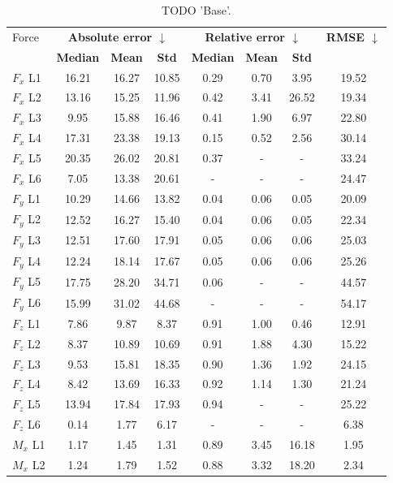 \begin{table}[h]
\centering
\caption{TODO 'Base'.}
\label{tab:prelim:base.tex}
\begin{tabular}{lccccccc}
\toprule
Force & \multicolumn{3}{c}{\bfseries Absolute error $\downarrow$} & \multicolumn{3}{c}{\bfseries Relative error $\downarrow$} & \bfseries RMSE $\downarrow$ \\
  & \bfseries Median & \bfseries Mean & \bfseries Std & \bfseries Median & \bfseries Mean & \bfseries Std & \bfseries   \\
\midrule
$F_x$ L1 & 16.21 & 16.27 & 10.85 & 0.29 & 0.70 & 3.95 & 19.52 \\
$F_x$ L2 & 13.16 & 15.25 & 11.96 & 0.42 & 3.41 & 26.52 & 19.34 \\
$F_x$ L3 & 9.95 & 15.88 & 16.46 & 0.41 & 1.90 & 6.97 & 22.80 \\
$F_x$ L4 & 17.31 & 23.38 & 19.13 & 0.15 & 0.52 & 2.56 & 30.14 \\
$F_x$ L5 & 20.35 & 26.02 & 20.81 & 0.37 & - & - & 33.24 \\
$F_x$ L6 & 7.05 & 13.38 & 20.61 & - & - & - & 24.47 \\
$F_y$ L1 & 10.29 & 14.66 & 13.82 & 0.04 & 0.06 & 0.05 & 20.09 \\
$F_y$ L2 & 12.52 & 16.27 & 15.40 & 0.04 & 0.06 & 0.05 & 22.34 \\
$F_y$ L3 & 12.51 & 17.60 & 17.91 & 0.05 & 0.06 & 0.06 & 25.03 \\
$F_y$ L4 & 12.24 & 18.14 & 17.67 & 0.05 & 0.06 & 0.06 & 25.26 \\
$F_y$ L5 & 17.75 & 28.20 & 34.71 & 0.06 & - & - & 44.57 \\
$F_y$ L6 & 15.99 & 31.02 & 44.68 & - & - & - & 54.17 \\
$F_z$ L1 & 7.86 & 9.87 & 8.37 & 0.91 & 1.00 & 0.46 & 12.91 \\
$F_z$ L2 & 8.37 & 10.89 & 10.69 & 0.91 & 1.88 & 4.30 & 15.22 \\
$F_z$ L3 & 9.53 & 15.81 & 18.35 & 0.90 & 1.36 & 1.92 & 24.15 \\
$F_z$ L4 & 8.42 & 13.69 & 16.33 & 0.92 & 1.14 & 1.30 & 21.24 \\
$F_z$ L5 & 13.94 & 17.84 & 17.93 & 0.94 & - & - & 25.22 \\
$F_z$ L6 & 0.14 & 1.77 & 6.17 & - & - & - & 6.38 \\
$M_x$ L1 & 1.17 & 1.45 & 1.31 & 0.89 & 3.45 & 16.18 & 1.95 \\
$M_x$ L2 & 1.24 & 1.79 & 1.52 & 0.88 & 3.32 & 18.20 & 2.34 \\

\end{tabular}
\end{table}
